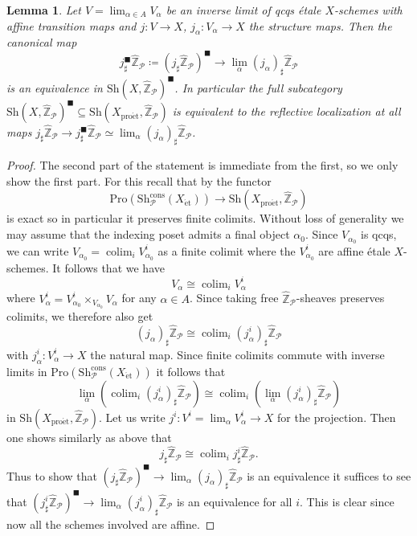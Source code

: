 \documentclass[10pt,a4paper]{amsart}
\newtheorem{lem}{Lemma}
\newcommand{\Sh}{\mathrm{Sh}}
\newcommand{\Z}{\mathbb{Z}}
\newcommand{\ZhatP}{\widehat{\Z}_\mc{P}}
\newcommand{\colim}{\operatorname{\mathrm{colim}}}
\newcommand{\et}{\mathrm{\acute{e}t}}
\newcommand{\mc}{\mathcal}
\newcommand{\proet}{\mathrm{pro\acute{e}t}}
\begin{document}
\begin{lem}
	\label{lem:solidification-of-general-pro-etale-map}
	Let $V = \lim_{\alpha \in A} V_\alpha$ be an inverse limit of qcqs \'etale $X$-schemes with affine transition maps and $j \colon V \to X$, $j_\alpha \colon V_\alpha \to X$ the structure maps.
	Then the canonical map
	\[
		j_\sharp^\blacksquare\ZhatP\coloneqq (j_\sharp \ZhatP)^{\blacksquare} \to \lim_\alpha (j_\alpha)_\sharp \ZhatP
	\]
	is an equivalence in $\Sh(X,\ZhatP)^{\blacksquare}$.
	In particular the full subcategory $\Sh(X,\ZhatP)^{\blacksquare} \subseteq \Sh(X_\proet,\ZhatP)$ is equivalent to the reflective localization at all maps $j_\sharp\ZhatP \to j_\sharp^\blacksquare\ZhatP\simeq\lim_\alpha (j_\alpha)_\sharp \ZhatP$. 
\end{lem}

\begin{proof}
	The second part of the statement is immediate from the first, so we only show the first part.
	For this recall that by  the functor \begin{equation*}\mathrm{Pro}(\Sh_\mc{P}^\mathrm{cons}(X_\et)) \to \Sh(X_\proet,\ZhatP)\end{equation*} is exact so in particular it preserves finite colimits.
	Without loss of generality we may assume that the indexing poset admits a final object $\alpha_0$.
	Since $V_{\alpha_0}$ is qcqs, we can write $V_{\alpha_0} = \colim_i V_{\alpha_0}^i$ as a finite colimit where the $V_{\alpha_0}^i$ are affine \'etale $X$-schemes.
	It follows that we have
	\[
		V_{\alpha} \cong \colim_i V_{\alpha}^i
	\]
	where $V_{\alpha}^i =  V_{\alpha_0}^i \times_{V_{\alpha_0}}  V_{\alpha}$ for any $\alpha \in A$.
	Since taking free $\ZhatP$-sheaves preserves colimits, we therefore also get
	\[
		(j_\alpha)_\sharp \ZhatP \cong \colim_i (j_\alpha^i)_\sharp \ZhatP
	\] with $j_\alpha^i\colon V_\alpha^i\to X$ the natural map.
	Since finite colimits commute with inverse limits in $\mathrm{Pro}(\Sh_\mc{P}^\mathrm{cons}(X_\et))$ it follows that
	\[
		\lim_\alpha(\colim_i (j_\alpha^i)_\sharp \ZhatP) \cong \colim_i (\lim_\alpha (j_\alpha^i)_\sharp \ZhatP)
	\]
	in $\Sh(X_\proet,\ZhatP)$.
	Let us write $j^i \colon V^i = \lim_\alpha V_{\alpha}^i \to X$ for the projection. 
	Then one shows similarly as above that
	\[
		j_\sharp \ZhatP \cong \colim_i j^i_\sharp \ZhatP.
	\]
	Thus to show that $(j_\sharp \ZhatP)^{\blacksquare} \to \lim_\alpha (j_\alpha)_\sharp \ZhatP$ is an equivalence it suffices to see that $(j^i_\sharp \ZhatP)^{\blacksquare} \to \lim_\alpha (j^i_\alpha)_\sharp \ZhatP$ is an equivalence for all $i$.
	This is clear since now all the schemes involved are affine.
\end{proof}
\end{document}
